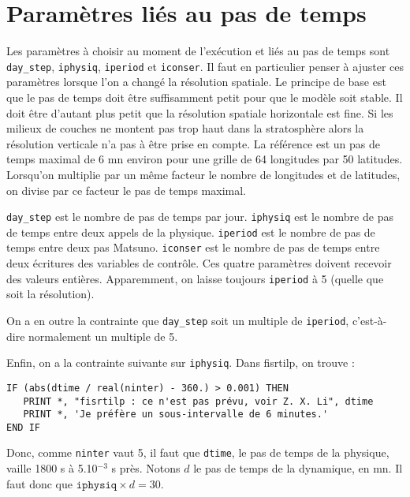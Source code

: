 \documentclass[a4paper,english,french]{article}
\begin{document}
\section{Paramètres liés au pas de temps}

Les paramètres à choisir au moment de l'exécution et liés au pas de
temps sont \verb+day_step+, \verb+iphysiq+, \verb+iperiod+ et
\verb+iconser+. Il faut en particulier penser à ajuster ces paramètres
lorsque l'on a changé la résolution spatiale. Le principe de base est
que le pas de temps doit être suffisamment petit pour que le modèle
soit stable. Il doit être d'autant plus petit que la résolution
spatiale horizontale est fine. Si les milieux de couches ne montent
pas trop haut dans la stratosphère alors la résolution verticale n'a
pas à être prise en compte. La référence est un pas de temps maximal
de 6 mn environ pour une grille de 64 longitudes par 50 latitudes.
Lorsqu'on multiplie par un même facteur le nombre de longitudes et de
latitudes, on divise par ce facteur le pas de temps maximal.

\verb+day_step+ est le nombre de pas de temps par jour. \verb+iphysiq+
est le nombre de pas de temps entre deux appels de la physique.
\verb+iperiod+ est le nombre de pas de temps entre deux pas Matsuno.
\verb+iconser+ est le nombre de pas de temps entre deux écritures des
variables de contrôle. Ces quatre paramètres doivent recevoir des
valeurs entières. Apparemment, on laisse toujours \verb+iperiod+ à 5
(quelle que soit la résolution).

On a en outre la contrainte que \verb+day_step+ soit un multiple de
\verb+iperiod+, c'est-à-dire normalement un multiple de 5.

Enfin, on a la contrainte suivante sur \verb+iphysiq+. Dans fisrtilp,
on trouve :
\begin{verbatim}
IF (abs(dtime / real(ninter) - 360.) > 0.001) THEN
   PRINT *, "fisrtilp : ce n'est pas prévu, voir Z. X. Li", dtime
   PRINT *, 'Je préfère un sous-intervalle de 6 minutes.'
END IF
\end{verbatim}
Donc, comme \verb+ninter+ vaut 5, il faut que \verb+dtime+, le pas de
temps de la physique, vaille 1800 s à 5.10$^{-3}$ s près. Notons $d$
le pas de temps de la dynamique, en mn. Il faut donc que
$\mathtt{iphysiq} \times d = 30$.
\end{document}
